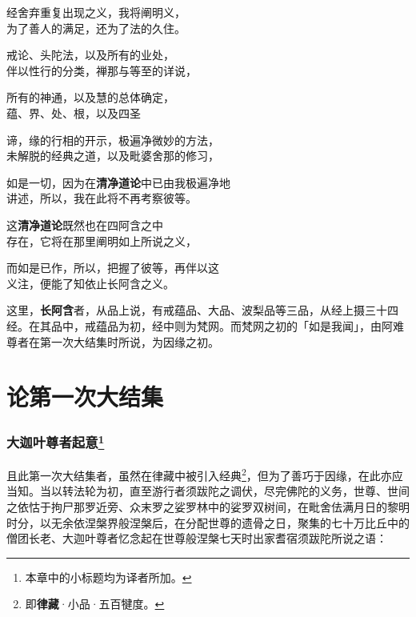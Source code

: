 \begin{quoting}经舍弃重复出现之义，我将阐明义，\\为了善人的满足，还为了法的久住。\end{quoting}

\begin{quoting}戒论、头陀法，以及所有的业处，\\伴以性行的分类，禅那与等至的详说，\end{quoting}

\begin{quoting}所有的神通，以及慧的总体确定，\\蕴、界、处、根，以及四圣\end{quoting}

\begin{quoting}谛，缘的行相的开示，极遍净微妙的方法，\\未解脱的经典之道，以及毗婆舍那的修习，\end{quoting}

\begin{quoting}如是一切，因为在\textbf{清净道论}中已由我极遍净地\\讲述，所以，我在此将不再考察彼等。\end{quoting}

\begin{quoting}这\textbf{清净道论}既然也在四阿含之中\\存在，它将在那里阐明如上所说之义，\end{quoting}

\begin{quoting}而如是已作，所以，把握了彼等，再伴以这\\义注，便能了知依止长阿含之义。\end{quoting}

这里，\textbf{长阿含}者，从品上说，有戒蕴品、大品、波梨品等三品，从经上摄三十四经。在其品中，戒蕴品为初，经中则为梵网。而梵网之初的「如是我闻」，由阿难尊者在第一次大结集时所说，为因缘之初。

\chapter{论第一次大结集}

\subsection*{大迦叶尊者起意\footnote{本章中的小标题均为译者所加。}}

且此第一次大结集者，虽然在律藏中被引入经典\footnote{即\textbf{律藏}·小品·五百犍度。}，但为了善巧于因缘，在此亦应当知。当以转法轮为初，直至游行者须跋陀之调伏，尽完佛陀的义务，世尊、世间之依怙于拘尸那罗近旁、众末罗之娑罗林中的娑罗双树间，在毗舍佉满月日的黎明时分，以无余依涅槃界般涅槃后，在分配世尊的遗骨之日，聚集的七十万比丘中的僧团长老、大迦叶尊者忆念起在世尊般涅槃七天时出家耆宿须跋陀所说之语：

